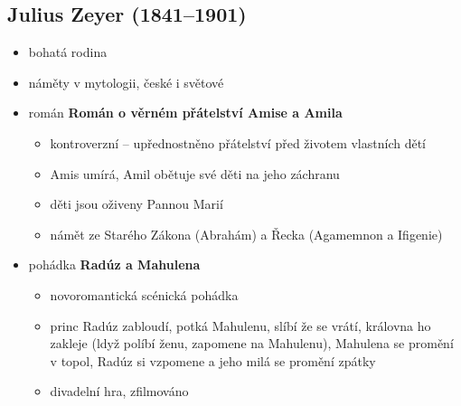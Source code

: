 \subsection{Julius Zeyer (1841--1901)}
\begin{itemize}
\item bohatá rodina
\item náměty v mytologii, české i světové
\item román \textbf{Román o věrném přátelství Amise a Amila}
	\begin{itemize}
	\item kontroverzní -- upřednostněno přátelství před životem vlastních dětí
	\item Amis umírá, Amil obětuje své děti na jeho záchranu
	\item děti jsou oživeny Pannou Marií
	\item námět ze Starého Zákona (Abrahám) a Řecka (Agamemnon a Ifigenie)
	\end{itemize}
\item pohádka \textbf{Radúz a Mahulena}
	\begin{itemize}
	\item novoromantická scénická pohádka
	\item princ Radúz zabloudí, potká Mahulenu, slíbí že se vrátí, královna ho zakleje (ldyž políbí ženu, zapomene na Mahulenu), Mahulena se promění v topol, Radúz si vzpomene a jeho milá se promění zpátky
	\item divadelní hra, zfilmováno
	\end{itemize}
\end{itemize}

